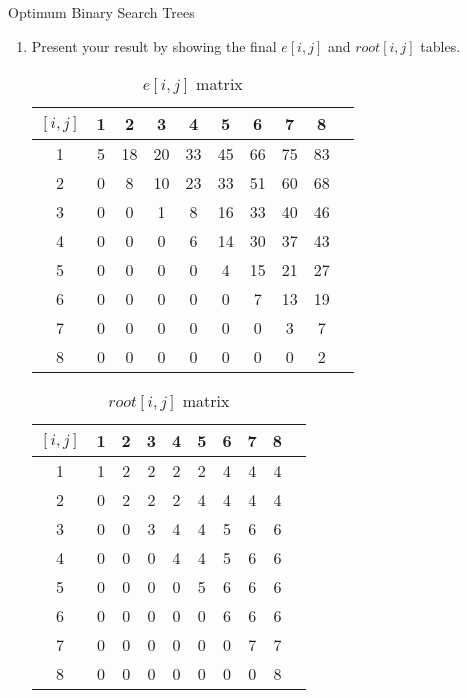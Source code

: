 \documentclass{article}
\numberwithin{table}{section}
\numberwithin{figure}{section}
\begin{document}
\begin{section}{Optimum Binary Search Trees}
\begin{enumerate}
    \item Present your result by showing the final $e[i, j]$ and $root[i, j]$ tables.
    \begin{tcolorbox}
        \begin{table}[H]
            \centering
            \begin{tabular}{|c|c|c|c|c|c|c|c|c|c|}
                \hline
                    $[i,j]$ & 1 & 2 & 3 & 4 & 5 & 6 & 7 & 8\\
                \hline
                    1 & 5 & 18 & 20 & 33 & 45 & 66 & 75 & 83\\
                    2 & 0 & 8 & 10 & 23 & 33 & 51 & 60 & 68\\
                    3 & 0 & 0 & 1 & 8 & 16 & 33 & 40 & 46\\
                    4 & 0 & 0 & 0 & 6 & 14 & 30 & 37 & 43\\
                    5 & 0 & 0 & 0 & 0 & 4 & 15 & 21 & 27\\
                    6 & 0 & 0 & 0 & 0 & 0 & 7 & 13 & 19\\
                    7 & 0 & 0 & 0 & 0 & 0 & 0 & 3 & 7\\
                    8 & 0 & 0 & 0 & 0 & 0 & 0 & 0 & 2\\
                \hline
            \end{tabular}
            \caption{$e[i,j]$ matrix}
            \label{tab:p2_a1}
        \end{table}
        \begin{table}[H]
            \centering
            \begin{tabular}{|c|c|c|c|c|c|c|c|c|c|}
                \hline
                    $[i,j]$ & 1 & 2 & 3 & 4 & 5 & 6 & 7 & 8\\
                \hline
                        1 & 1 & 2 & 2 & 2 & 2 & 4 & 4 & 4\\
                        2 & 0 & 2 & 2 & 2 & 4 & 4 & 4 & 4\\
                        3 & 0 & 0 & 3 & 4 & 4 & 5 & 6 & 6\\
                        4 & 0 & 0 & 0 & 4 & 4 & 5 & 6 & 6\\
                        5 & 0 & 0 & 0 & 0 & 5 & 6 & 6 & 6\\
                        6 & 0 & 0 & 0 & 0 & 0 & 6 & 6 & 6\\
                        7 & 0 & 0 & 0 & 0 & 0 & 0 & 7 & 7\\
                        8 & 0 & 0 & 0 & 0 & 0 & 0 & 0 & 8\\
                \hline
            \end{tabular}
            \caption{$root[i,j]$ matrix}
            \label{tab:p2_a2}
        \end{table}
    \end{tcolorbox}
    

\end{enumerate}
\end{section}
\end{document}
